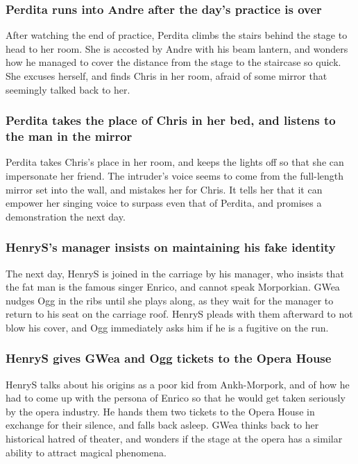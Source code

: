 \subsubsection{\Gls{Perdita} runs into \Gls{Andre} after the day's practice is over}
After watching the end of practice, \Gls{Perdita} climbs the stairs behind the stage to head to
her room. She is accosted by \Gls{Andre} with his beam lantern, and wonders how he managed to cover
the distance from the stage to the staircase so quick. She excuses herself, and finds \Gls{Chris}
in her room, afraid of some mirror that seemingly talked back to her.

\subsubsection{\Gls{Perdita} takes the place of \Gls{Chris} in her bed, and listens to the man in
    the mirror}
\Gls{Perdita} takes \Gls{Chris}'s place in her room, and keeps the lights off so that she can
impersonate her friend. The intruder's voice seems to come from the full-length mirror set into the
wall, and mistakes her for \Gls{Chris}. It tells her that it can empower her singing voice to
surpass even that of \Gls{Perdita}, and promises a demonstration the next day.

\subsubsection{\Gls{HenryS}'s manager insists on maintaining his fake identity}
The next day, \Gls{HenryS} is joined in the carriage by his manager, who insists that the fat man
is the famous singer \Gls{Enrico}, and cannot speak Morporkian. \Gls{GWea} nudges \Gls{Ogg} in the
ribs until she plays along, as they wait for the manager to return to his seat on the carriage roof.
\Gls{HenryS} pleads with them afterward to not blow his cover, and \Gls{Ogg} immediately asks him if
he is a fugitive on the run.

\subsubsection{\Gls{HenryS} gives \Gls{GWea} and \Gls{Ogg} tickets to the Opera House}
\Gls{HenryS} talks about his origins as a poor kid from Ankh-Morpork, and of how he had to come up
with the persona of \Gls{Enrico} so that he would get taken seriously by the opera industry. He
hands them two tickets to the Opera House in exchange for their silence, and falls back asleep.
\Gls{GWea} thinks back to her historical hatred of theater, and wonders if the stage at the opera
has a similar ability to attract magical phenomena.

